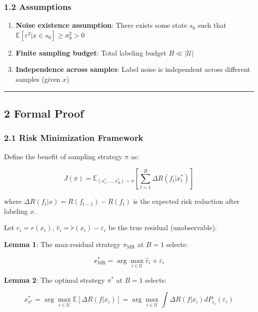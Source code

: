 \documentclass[
  12pt,
]{article}
\providecommand{\tightlist}{%
  \setlength{\itemsep}{0pt}\setlength{\parskip}{0pt}}
\begin{document}
\subsubsection{1.2 Assumptions}\label{assumptions}

\begin{enumerate}
\def\labelenumi{\arabic{enumi}.}
\tightlist
\item
  \textbf{Noise existence assumption}: There exists some state \(s_0\) such that
  \(\mathbb{E}[\varepsilon^2 | x \in s_0] \geq \sigma_0^2 > 0\)
\item
  \textbf{Finite sampling budget}: Total labeling budget \(B \ll |\mathcal{U}|\)
\item
  \textbf{Independence across samples}: Label noise is independent across different samples (given \(x\))
\end{enumerate}

\begin{center}\rule{0.5\linewidth}{0.5pt}\end{center}

\subsection{2 Formal Proof}\label{formal-proof}

\subsubsection{2.1
Risk Minimization Framework}\label{risk-minimization-framework}

Define the benefit of sampling strategy \(\pi\) as:

\[J(\pi) = \mathbb{E}_{(x_1^*, \ldots, x_B^*) \sim \pi}\left[\sum_{t=1}^B \Delta R(f_t | x_t^*)\right]\]

where \(\Delta R(f_t | x) = R(f_{t-1}) - R(f_t)\) is the expected risk reduction after labeling \(x\).

Let \(r_i = r(x_i)\), \(\hat{r}_i = \tilde{r}(x_i) - \varepsilon_i\)
be the true residual (unobservable).

\textbf{Lemma 1}: The max-residual strategy \(\pi_{\text{MR}}\) at \(B=1\)
selects:

\[x_{\text{MR}}^* = \arg\max_{i \in \mathcal{U}} \hat{r}_i + \varepsilon_i\]

\textbf{Lemma 2}: The optimal strategy \(\pi^*\) at \(B=1\) selects:

\[x_{\pi^*}^* = \arg\max_{i \in \mathcal{U}} \mathbb{E}[\Delta R(f | x_i)] = \arg\max_{i \in \mathcal{U}} \int \Delta R(f | x_i) dP_{\varepsilon_i}(\varepsilon_i)\]
\end{document}
